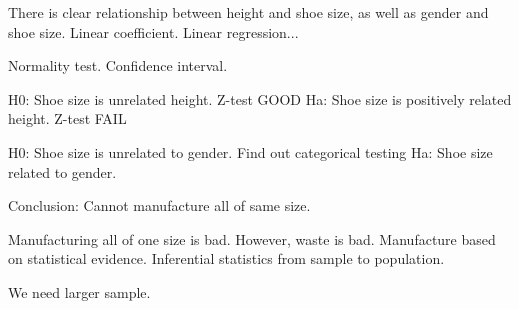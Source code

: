 There is clear relationship between height and shoe size, as well as gender and shoe size.
Linear coefficient.
Linear regression...

Normality test.
Confidence interval.

H0: Shoe size is unrelated height. Z-test GOOD
Ha: Shoe size is positively related height. Z-test FAIL

H0: Shoe size is unrelated to gender. Find out categorical testing
Ha: Shoe size related to gender.

Conclusion: Cannot manufacture all of same size.

Manufacturing all of one size is bad.
However, waste is bad.
Manufacture based on statistical evidence.
Inferential statistics from sample to population.

We need larger sample.